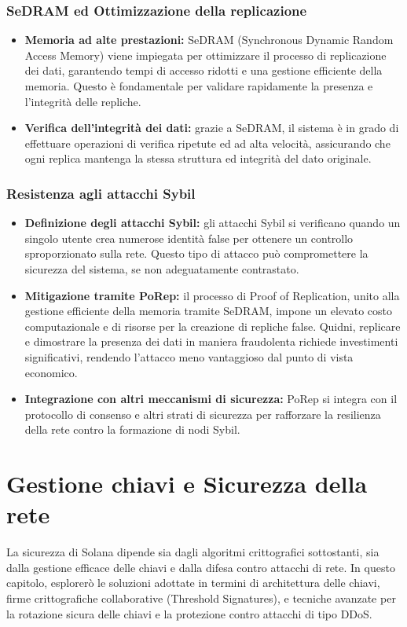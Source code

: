 \documentclass[a4paper,12pt]{report}
\begin{document}
	\subsection{SeDRAM ed Ottimizzazione della replicazione}
	\begin{itemize}
		\item \textbf{Memoria ad alte prestazioni:} SeDRAM (Synchronous Dynamic Random Access Memory) viene impiegata per ottimizzare il processo di replicazione dei dati, garantendo tempi di accesso ridotti e una gestione efficiente della memoria. Questo è fondamentale per validare rapidamente la presenza e l'integrità delle repliche.
		\item \textbf{Verifica dell’integrità dei dati:} grazie a SeDRAM, il sistema è in grado di effettuare operazioni di verifica ripetute ed ad alta velocità, assicurando che ogni replica mantenga la stessa struttura ed integrità del dato originale.
	\end{itemize}
	
	\subsection{Resistenza agli attacchi Sybil}
	\begin{itemize}
		\item \textbf{Definizione degli attacchi Sybil:} gli attacchi Sybil si verificano quando un singolo utente crea numerose identità false per ottenere un controllo sproporzionato sulla rete. Questo tipo di attacco può compromettere la sicurezza del sistema, se non adeguatamente contrastato.
		\item \textbf{Mitigazione tramite PoRep:} il processo di Proof of Replication, unito alla gestione efficiente della memoria tramite SeDRAM, impone un elevato costo computazionale e di risorse per la creazione di repliche false. Quidni, replicare e dimostrare la presenza dei dati in maniera fraudolenta richiede investimenti significativi, rendendo l'attacco meno vantaggioso dal punto di vista economico.
		\item \textbf{Integrazione con altri meccanismi di sicurezza:} PoRep si integra con il protocollo di consenso e altri strati di sicurezza per rafforzare la resilienza della rete contro la formazione di nodi Sybil.
	\end{itemize}
	
	\chapter{Gestione chiavi e Sicurezza della rete}
	La sicurezza di Solana dipende sia dagli algoritmi crittografici sottostanti, sia dalla gestione efficace delle chiavi e dalla difesa contro attacchi di rete. In questo capitolo, esplorerò le soluzioni adottate in termini di architettura delle chiavi, firme crittografiche collaborative (Threshold Signatures), e tecniche avanzate per la rotazione sicura delle chiavi e la protezione contro attacchi di tipo DDoS.
	
\end{document}
